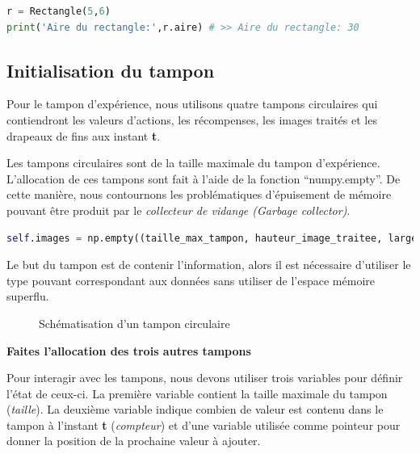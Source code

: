 \documentclass{article}
\begin{document}
\bigbreak
\begin{lstlisting}[language=Python, caption={Appel de la classe Rectange}, label={code:userectangle}]
r = Rectangle(5,6)
print('Aire du rectangle:',r.aire) # >> Aire du rectangle: 30
\end{lstlisting}

\subsection{Initialisation du tampon}
Pour le tampon d'expérience, nous utilisons quatre tampons circulaires qui contiendront les valeurs d'actions, les récompenses, les images traités et les drapeaux de fins aux instant \textbf{t}.

\bigbreak
Les tampons circulaires sont de la taille maximale du tampon d'expérience. L'allocation de ces tampons sont fait à l'aide de la fonction ``numpy.empty''. De cette manière, nous contournons les problématiques d'épuisement de mémoire pouvant être produit par le \textit{collecteur de vidange (Garbage collector)}.

\bigbreak
\begin{lstlisting}[language=Python, caption={Allocation du tampon contenant les images}, label={code:alloc}]
self.images = np.empty((taille_max_tampon, hauteur_image_traitee, largeur_image_traitee), dtype=np.uint8)
\end{lstlisting}

\bigbreak
Le but du tampon est de contenir l'information, alors il est nécessaire d'utiliser le type pouvant correspondant aux données sans utiliser de l'espace mémoire superflu.

\begin{figure}[H]
  \centering
  \caption{Schématisation d'un tampon circulaire}
  \label{fig:tampon}
\end{figure}

\bigbreak
\textbf{Faites l'allocation des trois autres tampons}
\bigbreak

Pour interagir avec les tampons, nous devons utiliser trois variables pour définir l'état de ceux-ci. La première variable contient la taille maximale du tampon (\textit{taille}). La deuxième variable indique combien de valeur est contenu dans le tampon à l'instant \textbf{t} (\textit{compteur}) et d'une variable utilisée comme pointeur pour donner la position de la prochaine valeur à ajouter.
\end{document}
